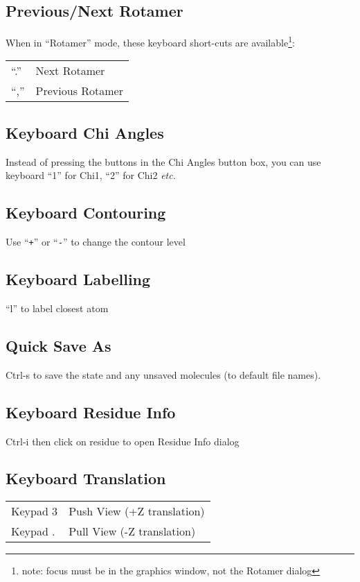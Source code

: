 \documentclass[twocolumn]{article}
\begin{document}
\subsection{Previous/Next Rotamer}

When in ``Rotamer'' mode, these keyboard short-cuts are
available\footnote{note: focus must be in the graphics window, not
  the Rotamer dialog}:

\begin{tabular}{ll}
  ``.'' & Next Rotamer \\
  ``,'' & Previous Rotamer
\end{tabular}

\subsection{Keyboard Chi Angles}
Instead of pressing the buttons in the Chi Angles button box, you can
use keyboard ``1'' for Chi1, ``2'' for Chi2 \emph{etc.}

\subsection{Keyboard Contouring}

Use ``\texttt{+}'' or ``\texttt{-}'' to change the contour level

\subsection{Keyboard Labelling}
``l'' to label closest atom

\subsection{Quick Save As} 
   Ctrl-s to save the state and any unsaved molecules (to default file names).

\subsection{Keyboard Residue Info} 
   Ctrl-i then click on residue to open Residue Info dialog 

\subsection{Keyboard Translation}
\begin{tabular}{ll}
  Keypad 3 & Push View (+Z translation)\\
  Keypad . & Pull View (-Z translation)
\end{tabular}
\end{document}
